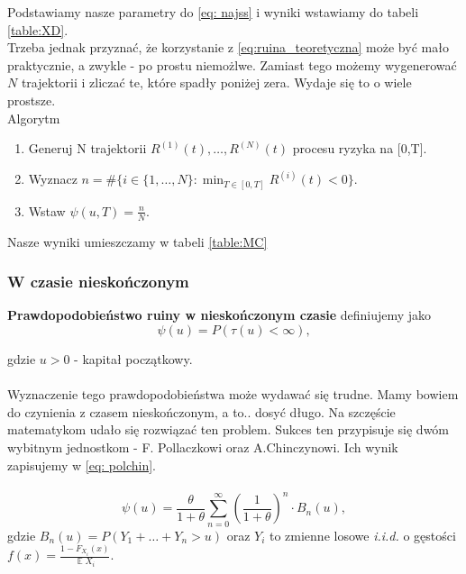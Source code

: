 \documentclass{article}
\theoremstyle{break}
\DeclareMathOperator{\EX}{\mathbb{E}}
\numberwithin{equation}{subsection}
\numberwithin{figure}{section}
\begin{document}
Podstawiamy nasze parametry do \eqref{eq: najss} i wyniki wstawiamy do tabeli \ref{table:XD}.\\
Trzeba jednak przyznać, że korzystanie z \eqref{eq:ruina_teoretyczna} może być mało praktycznie, a zwykle - po prostu niemożlwe. Zamiast tego możemy wygenerować $N$ trajektorii i zliczać te, które spadły poniżej zera. Wydaje się to o wiele prostsze.\\

Algorytm\\
\begin{enumerate}
	\item Generuj N trajektorii $R^{(1)}(t),\dots,R^{(N)}(t)$ procesu ryzyka na [0,T].
	\item Wyznacz $n=\#\{i\in\{1,\dots,N\}:\min_{T\in[0,T]}R^{(i)}(t)<0\}$.
	\item Wstaw $\psi(u,T)=\frac{n}{N}$.
\end{enumerate}

Nasze wyniki umieszczamy w tabeli \ref{table:MC}

\subsubsection{W czasie nieskończonym}

\textbf{Prawdopodobieństwo ruiny w nieskończonym czasie} definiujemy jako\\

\begin{equation}
\psi(u)=P(\tau(u)<\infty),
\end{equation}

gdzie $u > 0$ - kapitał początkowy. \\
\\
Wyznaczenie tego prawdopodobieństwa może wydawać się trudne. Mamy bowiem do czynienia z czasem nieskończonym, a to.. dosyć długo. Na szczęście matematykom udało się rozwiązać ten problem.
Sukces ten przypisuje się dwóm wybitnym jednostkom - F. Pollaczkowi oraz A.Chinczynowi. Ich wynik zapisujemy w \eqref{eq: polchin}.
\\\\
\begin{equation}
\psi(u)=\frac{\theta}{1+\theta}\sum_{n=0}^{\infty}\left(\frac{1}{1+\theta}\right)^n\cdot B_n(u), \label{eq: polchin}
\end{equation}
gdzie $B_n(u)=P(Y_1+\dots+Y_n>u)$ oraz $Y_i$ to zmienne losowe \emph{i.i.d.} o gęstości $f(x)=\frac{1-F_{X_i}(x)}{\EX{X_i}}$.\\
\end{document}

